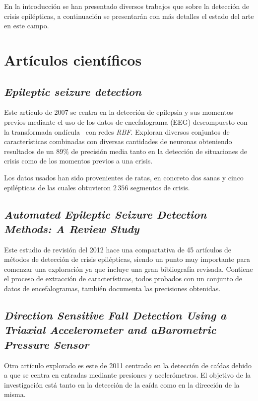 
En la introducción se han presentado diversos trabajos que sobre la detección de crisis epilépticas, a continuación se presentarán con más detalles el estado del arte en este campo.

\section{Artículos científicos}\label{cap:trabrel}
\subsection{\textbf{\textit{Epileptic seizure detection}}~\cite{schuyler2007epileptic}}
Este artículo de 2007 se centra en la detección de epilepsia y sus momentos previos mediante el uso de los datos de encefalograma (EEG) descompuesto con la transformada ondícula~\cite{wiki:ondicula} con redes \textit{RBF}. Exploran diversos conjuntos de características combinadas con diversas cantidades de neuronas obteniendo resultados de un $89\%$ de precisión media tanto en la detección de situaciones de crisis como de los momentos previos a una crisis.

Los datos usados han sido provenientes de ratas, en concreto dos sanas y cinco epilépticas de las cuales obtuvieron $2\,356$ segmentos de crisis.

\subsection{\textbf{\textit{Automated Epileptic Seizure Detection Methods: A Review Study}}~\cite{tzallas2012review}}
Este estudio de revisión del 2012 hace una compartativa de 45 artículos de métodos de detección de crisis epilépticas, siendo un punto muy importante para comenzar una exploración ya que incluye una gran bibliografía revisada. Contiene el proceso de extracción de características, todos probados con un conjunto de datos de encefalogramas, también documenta las precisiones obtenidas. 

\subsection{\textbf{\textit{Direction  Sensitive  Fall  Detection  Using  a  Triaxial  Accelerometer  and  aBarometric  Pressure  Sensor}}~\cite{tolkiehn2011fall}}
Otro artículo explorado es este de 2011 centrado en la detección de caídas debido a que se centra en entradas mediante presiones y acelerómetros. El objetivo de la investigación está tanto en la detección de la caída como en la dirección de la misma. 


